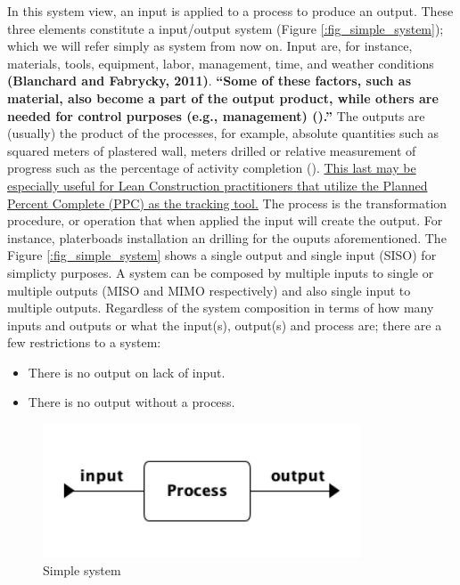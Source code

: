 \documentclass{article}
\begin{document}
\begin{itemize}
In this system view, an input is applied to a process to produce an output.
These three elements constitute a input/output system (Figure \ref{:fig_simple_system});  which we will refer simply as system from now on.
Input are, for instance, materials, tools, equipment, labor, management, time, and weather conditions \textbf{(Blanchard and Fabrycky, 2011)}.
\textbf{``Some of these factors, such as material, also become a part of the output product, while others are needed for control purposes (e.g., management) (\citep{Remold1989}).''}
The outputs are (usually) the product of the processes, for example, absolute quantities such as squared meters of plastered wall, meters drilled or relative measurement of progress such as the percentage of activity completion (\citep{Antunes2016}).
\uline{This last may be especially useful for Lean Construction practitioners that utilize the Planned Percent Complete (PPC) as the tracking tool.}
The process is the transformation procedure, or operation that when applied the input will create the output.
For instance, platerboads installation an drilling for the ouputs aforementioned.
The Figure \ref{:fig_simple_system} shows a single output and single input (SISO) for simplicty purposes.
A system can be composed by multiple inputs to single or multiple outputs (MISO and MIMO respectively) and also single input to multiple outputs.
Regardless of the system composition in terms of how many inputs and outputs or what the input(s), output(s) and process are; there are a few restrictions to a system:
\begin{itemize}
\item There is no output on lack of input.
\item There is no output without a process.
\end{itemize}
\end{itemize}


\begin{figure}[htbp]
\centering
\includegraphics[height=150]{Figures/system_basic.png}
\caption{\label{fig:org208fecd}Simple system}
\end{figure}
\end{document}
